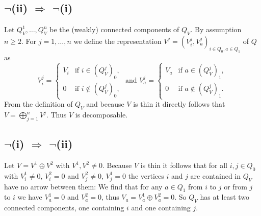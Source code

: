 \documentclass[a4paper,10pt]{article}
\theoremstyle{definition}
\begin{document}
\section{}


\subsection*{$\neg$(ii) $\Rightarrow$ $\neg$(i)}
Let $Q_V^1, \ldots, Q_V^n$ be the (weakly) connected components of $Q_V$. By assumption $n \geq 2$. For $j=1,\ldots,n$ we define the representation $V^j = (V^j_i, V^j_a)_{i \in Q_0, a \in Q_1}$ of $Q$ as
\[
 V^j_i =
 \begin{cases}
  V_i & \text{if } i \in (Q^j_V)_0, \\
    0 & \text{if } i \not\in (Q^j_V)_0,
 \end{cases}
 \text{ and }
 V^j_a =
 \begin{cases}
  V_a & \text{if } a \in (Q^j_V)_1, \\
    0 & \text{if } a \not\in (Q^j_V)_1.
 \end{cases}
\]
From the definition of $Q_V$ and because $V$ is thin it directly follows that $V = \bigoplus_{j=1}^n V^j$. Thus $V$ is decomposable.


\subsection*{$\neg$(i) $\Rightarrow$ $\neg$(ii)}
Let $V = V^1 \oplus V^2$ with $V^1, V^2 \neq 0$. Because $V$ is thin it follows that for all $i,j \in Q_0$ with $V^1_i \neq 0$, $V^2_i = 0$ and $V^2_j \neq 0$, $V^1_j = 0$ the vertices $i$ and $j$ are contained in $Q_V$ have no arrow between them: We find that for any $a \in Q_1$ from $i$ to $j$ or from $j$ to $i$ we have $V^1_a = 0$ and $V^2_a = 0$, thus $V_a = V^1_a \oplus V^2_a = 0$. So $Q_V$ has at least two connected components, one containing $i$ and one containing $j$.
\end{document}
